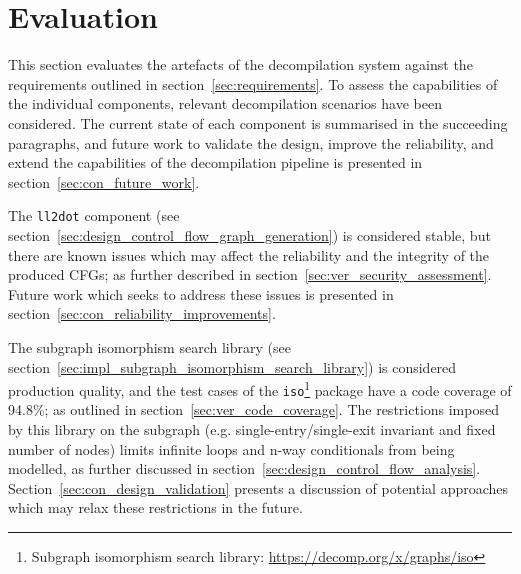 
%

%
%

\section{Evaluation}
\label{sec:evaluation}

This section evaluates the artefacts of the decompilation system against the requirements outlined in section~\ref{sec:requirements}. To assess the capabilities of the individual components, relevant decompilation scenarios have been considered. The current state of each component is summarised in the succeeding paragraphs, and future work to validate the design, improve the reliability, and extend the capabilities of the decompilation pipeline is presented in section~\ref{sec:con_future_work}.

The \texttt{ll2dot} component (see section~\ref{sec:design_control_flow_graph_generation}) is considered stable, but there are known issues which may affect the reliability and the integrity of the produced CFGs; as further described in section~\ref{sec:ver_security_assessment}. Future work which seeks to address these issues is presented in section~\ref{sec:con_reliability_improvements}.

The subgraph isomorphism search library (see section~\ref{sec:impl_subgraph_isomorphism_search_library}) is considered production quality, and the test cases of the \texttt{iso}\footnote{Subgraph isomorphism search library: \url{https://decomp.org/x/graphs/iso}} package have a code coverage of 94.8\%; as outlined in section~\ref{sec:ver_code_coverage}. The restrictions imposed by this library on the subgraph (e.g. single-entry/single-exit invariant and fixed number of nodes) limits infinite loops and n-way conditionals from being modelled, as further discussed in section~\ref{sec:design_control_flow_analysis}. Section~\ref{sec:con_design_validation} presents a discussion of potential approaches which may relax these restrictions in the future.

